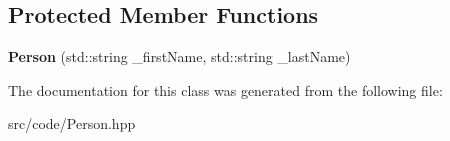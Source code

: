 \subsection*{Protected Member Functions}
\begin{DoxyCompactItemize}
\item 
\mbox{\label{class_person_a8bdbedb3cddca76928a19aaee29ffa37}} 
{\bfseries Person} (std\+::string \+\_\+first\+Name, std\+::string \+\_\+last\+Name)
\end{DoxyCompactItemize}


The documentation for this class was generated from the following file\+:\begin{DoxyCompactItemize}
\item 
src/code/Person.\+hpp\end{DoxyCompactItemize}
